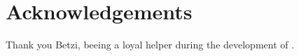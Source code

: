 \thispagestyle{empty}
\chapter*{Acknowledgements}
\thispagestyle{empty}
Thank you Betzi, beeing a loyal helper during the development of \exgo.
\newpage
\thispagestyle{empty}
\ 